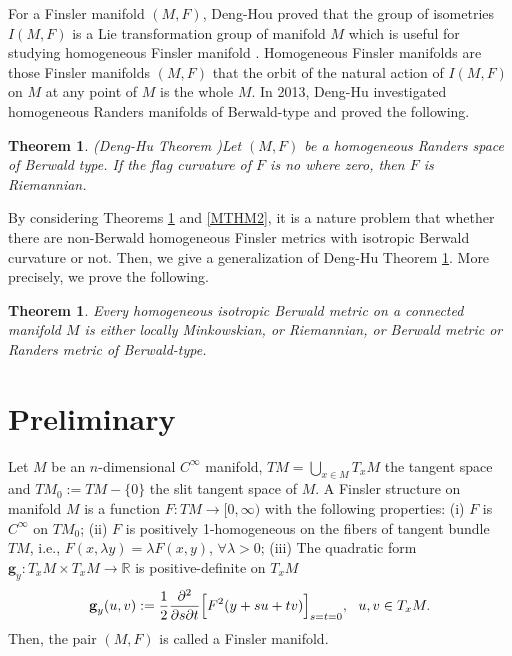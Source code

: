 \documentclass[12pt,a4paper]{article}
\newcounter{alphthm}
\newtheorem{propriete}[alphthm]{Theorem}
\newtheorem{thm}{Theorem}[section]
\theoremstyle{definition}
\numberwithin{equation}{section}
\begin{document}
For a  Finsler manifold $(M, F)$, Deng-Hou  proved that the group of isometries $I(M, F)$  is a Lie transformation group of  manifold $M$ which is useful for studying homogeneous Finsler manifold  \cite{D2}. Homogeneous Finsler manifolds are those Finsler manifolds $(M, F)$ that the orbit of the natural  action  of $I(M, F)$ on $M$ at any point of $M$ is the whole $M$.  In 2013, Deng-Hu investigated homogeneous Randers manifolds of Berwald-type and proved the following.
\begin{propriete}{\rm (Deng-Hu  Theorem \cite{DH})}\label{DH}
Let $(M, F)$ be a homogeneous Randers space of Berwald type. If the flag curvature of $F$ is no where zero, then $F$ is Riemannian.
\end{propriete}
By considering Theorems \ref{DH} and \ref{MTHM2}, it is a nature problem that whether there are  non-Berwald homogeneous Finsler metrics with isotropic Berwald curvature or not. Then, we give a generalization of Deng-Hu  Theorem \ref{DH}. More precisely, we prove the following.
\begin{thm}\label{TN}
Every   homogeneous  isotropic Berwald   metric on a connected manifold $M$ is  either  locally Minkowskian, or Riemannian, or Berwald metric or Randers metric of Berwald-type.
\end{thm}

\section{Preliminary}
Let $M$ be an $n$-dimensional $C^{\infty}$ manifold, $TM=\bigcup_{x \in M}T_{x}M$ the tangent space and $TM_0:=TM-\{0\}$ the slit tangent space of $M$. A Finsler structure on manifold $M$ is a function $ F:TM\rightarrow [0,\infty )$ with the following properties: (i) $F$ is $C^\infty$ on $TM_0$; (ii) $F$ is positively 1-homogeneous on the fibers of tangent  bundle $TM$, i.e., $F(x,\lambda y)=\lambda F(x,y)$, $\forall \lambda>0$;  (iii)   The   quadratic form $\textbf{g}_y:T_xM \times T_xM\rightarrow \mathbb{R}$ is positive-definite on $T_xM$
\[
\textbf{g}_{y}(u,v):={1 \over 2}\frac{\partial^2}{\partial s\partial t} \Big[  F^2 (y+su+tv)\Big]_{s=t=0}, \ \
u,v\in T_xM.
\]
Then, the pair  $(M,F)$ is called a  Finsler manifold.
\end{document}
